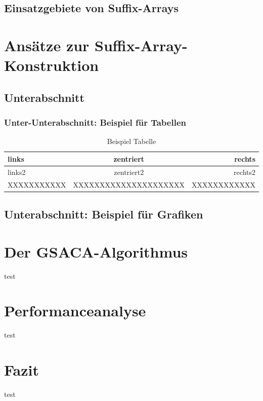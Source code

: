 \documentclass[twoside,11pt]{article}
\theoremstyle{break}
\begin{document}
\subsection{Einsatzgebiete von Suffix-Arrays}

\section{Ansätze zur Suffix-Array-Konstruktion}

\subsection{Unterabschnitt}

\subsubsection{Unter-Unterabschnitt: Beispiel f\"ur Tabellen}

\begin{table}[H]
\begin{center}
\caption{Beispiel Tabelle}
\label{tab:beispiel}

\vspace{2ex}

\begin{tabular}{|l|c|r|}
\hline
links		&	zentriert	&	rechts  \\ \hline\hline
links2		&	zentriert2	&	rechts2 \\ \hline
XXXXXXXXXXX	& XXXXXXXXXXXXXXXXXXXXX	& XXXXXXXXXXXX  \\ \hline

\end{tabular}
\end{center}
\end{table}


\subsection{Unterabschnitt: Beispiel f\"ur Grafiken}

\section{Der GSACA-Algorithmus}

test

\section{Performanceanalyse}

test

\section{Fazit}

test

\newpage



\end{document}
